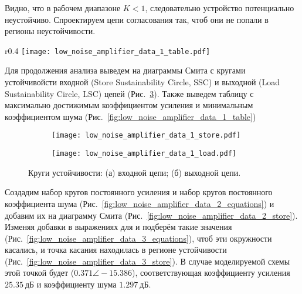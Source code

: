 Видно, что в рабочем диапазоне $K < 1$, следовательно устройство потенциально неустойчиво.
Спроектируем цепи согласования так, чтоб они не попали в регионы неустойчивости.

\begin{wrapfigure}{r}{0.4\textwidth}
        \centering
        \texttt{[image: low\_noise\_amplifier\_data\_1\_table.pdf]}
        \caption{Максимальный коэффициент усиления и минимальный коэффициент шума}%
        \label{fig:low_noise_amplifier_data_1_table}
\end{wrapfigure}
Для продолжения анализа выведем на диаграммы Смита с кругами устойчивойсти входной (Store Sustainability Circle, SSC) и выходной (Load Sustainability Circle, LSC) цепей (Рис.~\ref{fig:low_noise_amplifier_data_1_sustainability_circles}).
Также выведем таблицу с максимально достижимым коэффициентом усиления и минимальным коэффициентом шума (Рис.~\ref{fig:low_noise_amplifier_data_1_table})

\begin{figure}[!ht]
    \centering
    \hfill
    \begin{subfigure}[b]{0.45\textwidth}
        \centering
        \texttt{[image: low\_noise\_amplifier\_data\_1\_store.pdf]}
        \caption{}%
        \label{fig:low_noise_amplifier_data_1_store}
    \end{subfigure}
    \hfill
    \begin{subfigure}[b]{0.45\textwidth}
        \centering
        \texttt{[image: low\_noise\_amplifier\_data\_1\_load.pdf]}
        \caption{}%
        \label{fig:low_noise_amplifier_data_1_load}
    \end{subfigure}
    \hfill
    \caption{%
        Круги устойчивости:
        (а) входной цепи;
        (б) выходной цепи.
    }%
    \label{fig:low_noise_amplifier_data_1_sustainability_circles}
\end{figure}

Создадим набор кругов постоянного усиления и набор кругов постоянного коэффициента шума (Рис.~\ref{fig:low_noise_amplifier_data_2_equations}) и добавим их на диаграмму Смита (Рис.~\ref{fig:low_noise_amplifier_data_2_store}).
Изменяя добавки в выражениях для  и  подберём такие значения (Рис.~\ref{fig:low_noise_amplifier_data_3_equations}), чтоб эти окружности касались, и точка касания находилась в регионе устойчивости (Рис.~\ref{fig:low_noise_amplifier_data_3_store}).
В случае моделируемой схемы этой точкой будет ($0.371 \angle-15.386$), соответствующая коэффициенту усиления $25.35~\text{дБ}$ и коэффициенту шума $1.297~\text{дБ}$.


